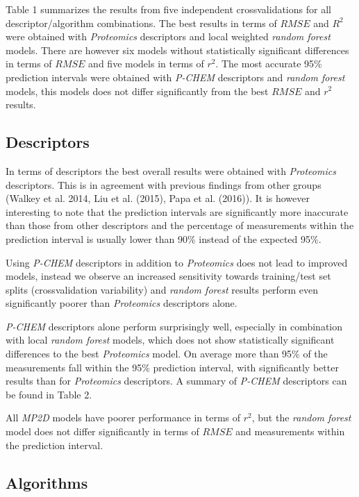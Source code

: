 \documentclass[utf8]{frontiersHLTH} %
\begin{document}
Table 1 summarizes the results from five independent crossvalidations
for all descriptor/algorithm combinations. The best results in terms of
\(RMSE\) and \(R^2\) were obtained with \emph{Proteomics} descriptors
and local weighted \emph{random forest} models. There are however six
models without statistically significant differences in terms of
\(RMSE\) and five models in terms of \(r^2\). The most accurate 95\%
prediction intervals were obtained with \emph{P-CHEM} descriptors and
\emph{random forest} models, this models does not differ significantly
from the best \(RMSE\) and \(r^2\) results.

\subsection{Descriptors}\label{descriptors}

In terms of descriptors the best overall results were obtained with
\emph{Proteomics} descriptors. This is in agreement with previous
findings from other groups (Walkey et al. 2014, Liu et al. (2015), Papa
et al. (2016)). It is however interesting to note that the prediction
intervals are significantly more inaccurate than those from other
descriptors and the percentage of measurements within the prediction
interval is usually lower than 90\% instead of the expected 95\%.

Using \emph{P-CHEM} descriptors in addition to \emph{Proteomics} does
not lead to improved models, instead we observe an increased sensitivity
towards training/test set splits (crossvalidation variability) and
\emph{random forest} results perform even significantly poorer than
\emph{Proteomics} descriptors alone.

\emph{P-CHEM} descriptors alone perform surprisingly well, especially in
combination with local \emph{random forest} models, which does not show
statistically significant differences to the best \emph{Proteomics}
model. On average more than 95\% of the measurements fall within the
95\% prediction interval, with significantly better results than for
\emph{Proteomics} descriptors. A summary of \emph{P-CHEM} descriptors
can be found in Table 2.

All \emph{MP2D} models have poorer performance in terms of \(r^2\), but
the \emph{random forest} model does not differ significantly in terms of
\(RMSE\) and measurements within the prediction interval.

\subsection{Algorithms}\label{algorithms-1}
\end{document}

